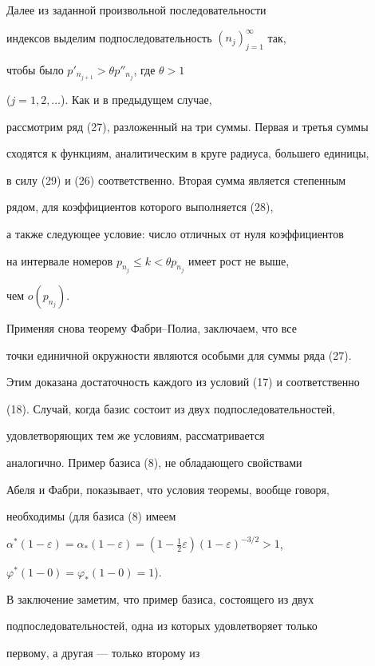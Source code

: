 Далее из заданной произвольной последовательности 


индексов выделим подпоследовательность $(n_j)^\infty_{j=1}$ так, 


чтобы было $p'_{n_{j+1}}>\theta p''_{n_j}$, где $\theta>1$ 


($j=1,2,\dotsc$). Как и в предыдущем случае, 


рассмотрим ряд (27), разложенный на три суммы. Первая и третья суммы 


сходятся к функциям, аналитическим в круге радиуса, большего единицы, 


в силу (29) и (26) соответственно. Вторая сумма является степенным 


рядом, для коэффициентов которого выполняется (28), 


а также следующее условие: число отличных от нуля коэффициентов 


на интервале номеров $p_{n_j}\le k<\theta p_{n_j}$ имеет рост не выше, 


чем $o(p_{n_j})$. 


Применяя снова теорему Фабри--Полиа, заключаем, что все 


точки единичной окружности являются особыми для суммы ряда (27). 


 


Этим доказана достаточность каждого из условий (17) и соответственно 


(18). Случай, когда базис состоит из двух подпоследовательностей, 


удовлетворяющих тем же условиям, рассматривается 


аналогично. Пример базиса (8), не обладающего свойствами 


Абеля и Фабри, показывает, что условия теоремы, вообще говоря, 


необходимы (для базиса (8) имеем 


$\alpha^*(1-\varepsilon)=\alpha_*(1-\varepsilon)= 


(1-\frac{1}{2}\varepsilon)(1-\varepsilon)^{-3/2}>1$, 


$\varphi^*(1-0)=\varphi_*(1-0)=1$). 


 


В заключение заметим, что пример базиса, состоящего из двух 


подпоследовательностей, одна из которых удовлетворяет только 


первому, а другая --- только второму из 


